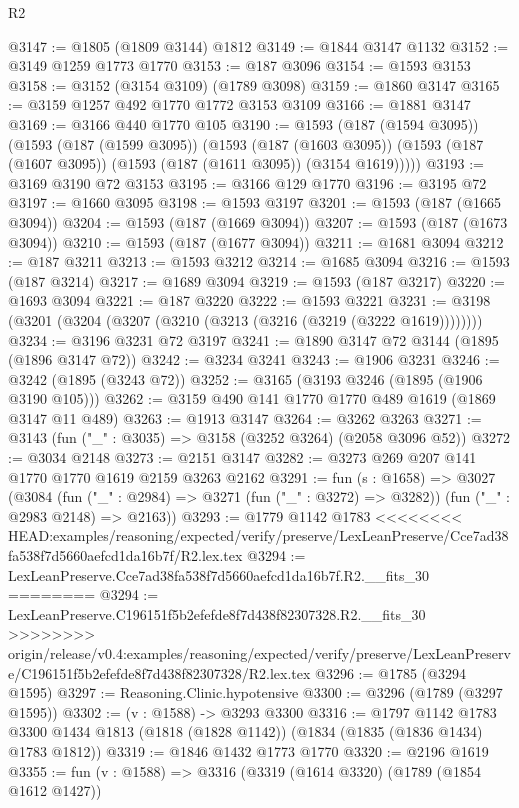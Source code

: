 \begin{lexlean}{R2}
\begin{coremodule}
{{{{{{{{{{{{{{{{{{{{{{{{{{{{{{{{{{{{{{{{{{{{{{{{{{{{{{{{{{{{{{{{{{{{{{{{{{{{{{{{{{{{{{{{{{{{@3147 := @1805 (@1809 @3144) @1812
@3149 := @1844 @3147 @1132
@3152 := @3149 @1259 @1773 @1770
@3153 := @187 @3096
@3154 := @1593 @3153
@3158 := @3152 (@3154 @3109) (@1789 @3098)
@3159 := @1860 @3147
@3165 := @3159 @1257 @492 @1770 @1772 @3153 @3109
@3166 := @1881 @3147
@3169 := @3166 @440 @1770 @105
@3190 := @1593
    (@187 (@1594 @3095))
    (@1593
      (@187 (@1599 @3095))
      (@1593
        (@187 (@1603 @3095))
        (@1593 (@187 (@1607 @3095)) (@1593 (@187 (@1611 @3095)) (@3154 @1619)))))
@3193 := @3169 @3190 @72 @3153
@3195 := @3166 @129 @1770
@3196 := @3195 @72
@3197 := @1660 @3095
@3198 := @1593 @3197
@3201 := @1593 (@187 (@1665 @3094))
@3204 := @1593 (@187 (@1669 @3094))
@3207 := @1593 (@187 (@1673 @3094))
@3210 := @1593 (@187 (@1677 @3094))
@3211 := @1681 @3094
@3212 := @187 @3211
@3213 := @1593 @3212
@3214 := @1685 @3094
@3216 := @1593 (@187 @3214)
@3217 := @1689 @3094
@3219 := @1593 (@187 @3217)
@3220 := @1693 @3094
@3221 := @187 @3220
@3222 := @1593 @3221
@3231 := @3198 (@3201 (@3204 (@3207 (@3210 (@3213 (@3216 (@3219 (@3222 @1619))))))))
@3234 := @3196 @3231 @72 @3197
@3241 := @1890 @3147 @72 @3144 (@1895 (@1896 @3147 @72))
@3242 := @3234 @3241
@3243 := @1906 @3231
@3246 := @3242 (@1895 (@3243 @72))
@3252 := @3165 (@3193 @3246 (@1895 (@1906 @3190 @105)))
@3262 := @3159 @490 @141 @1770 @1770 @489 @1619 (@1869 @3147 @11 @489)
@3263 := @1913 @3147
@3264 := @3262 @3263
@3271 := @3143 (fun ("_" : @3035) => @3158 (@3252 @3264) (@2058 @3096 @52))
@3272 := @3034 @2148
@3273 := @2151 @3147
@3282 := @3273 @269 @207 @141 @1770 @1770 @1619 @2159 @3263 @2162
@3291 := fun (s : @1658) =>
  @3027
    (@3084
      (fun ("_" : @2984) => @3271 (fun ("_" : @3272) => @3282))
      (fun ("_" : @2983 @2148) => @2163))
@3293 := @1779 @1142 @1783
<<<<<<<< HEAD:examples/reasoning/expected/verify/preserve/LexLeanPreserve/Cce7ad38fa538f7d5660aefcd1da16b7f/R2.lex.tex
@3294 := LexLeanPreserve.Cce7ad38fa538f7d5660aefcd1da16b7f.R2.__fits_30
========
@3294 := LexLeanPreserve.C196151f5b2efefde8f7d438f82307328.R2.__fits_30
>>>>>>>> origin/release/v0.4:examples/reasoning/expected/verify/preserve/LexLeanPreserve/C196151f5b2efefde8f7d438f82307328/R2.lex.tex
@3296 := @1785 (@3294 @1595)
@3297 := Reasoning.Clinic.hypotensive
@3300 := @3296 (@1789 (@3297 @1595))
@3302 := (v : @1588) -> @3293 @3300
@3316 := @1797
    @1142
    @1783
    @3300
    @1434
    @1813
    (@1818 (@1828 @1142))
    (@1834 (@1835 (@1836 @1434) @1783 @1812))
@3319 := @1846 @1432 @1773 @1770
@3320 := @2196 @1619
@3355 := fun (v : @1588) =>
  @3316
    (@3319
      (@1614 @3320)
      (@1789 (@1854 @1612 @1427))
}}}}}}}}}}}}}}}}}}}}}}}}}}}}}}}}}}}}}}}}}}}}}}}}}}}}}}}}}}}}}}}}}}}}}}}}}}}}}}}}}}}}}}}}}}}}
\end{coremodule}
\end{lexlean}
